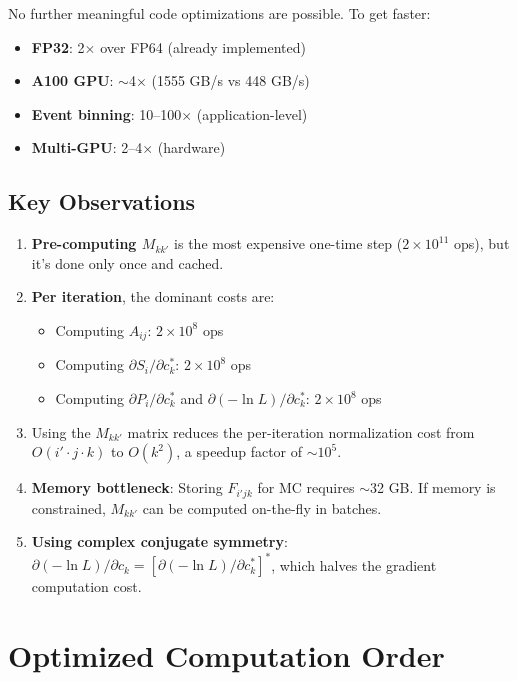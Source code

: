 \documentclass[11pt,a4paper]{article}
\begin{document}
No further meaningful code optimizations are possible. To get faster:
\begin{itemize}
    \item \textbf{FP32}: 2$\times$ over FP64 (already implemented)
    \item \textbf{A100 GPU}: $\sim$4$\times$ (1555 GB/s vs 448 GB/s)
    \item \textbf{Event binning}: 10--100$\times$ (application-level)
    \item \textbf{Multi-GPU}: 2--4$\times$ (hardware)
\end{itemize}

\subsection{Key Observations}

\begin{enumerate}
\item \textbf{Pre-computing $M_{kk'}$} is the most expensive one-time step ($2 \times 10^{11}$ ops), but it's done only once and cached.

\item \textbf{Per iteration}, the dominant costs are:
\begin{itemize}
\item Computing $A_{ij}$: $2 \times 10^8$ ops
\item Computing $\partial S_i/\partial c_k^*$: $2 \times 10^8$ ops
\item Computing $\partial P_i/\partial c_k^*$ and $\partial(-\ln L)/\partial c_k^*$: $2 \times 10^8$ ops
\end{itemize}

\item Using the $M_{kk'}$ matrix reduces the per-iteration normalization cost from $O(i' \cdot j \cdot k)$ to $O(k^2)$, a speedup factor of $\sim 10^5$.

\item \textbf{Memory bottleneck}: Storing $F_{i'jk}$ for MC requires $\sim$32 GB. If memory is constrained, $M_{kk'}$ can be computed on-the-fly in batches.

\item \textbf{Using complex conjugate symmetry}: $\partial(-\ln L)/\partial c_k = [\partial(-\ln L)/\partial c_k^*]^*$, which halves the gradient computation cost.
\end{enumerate}

\section{Optimized Computation Order}
\end{document}
